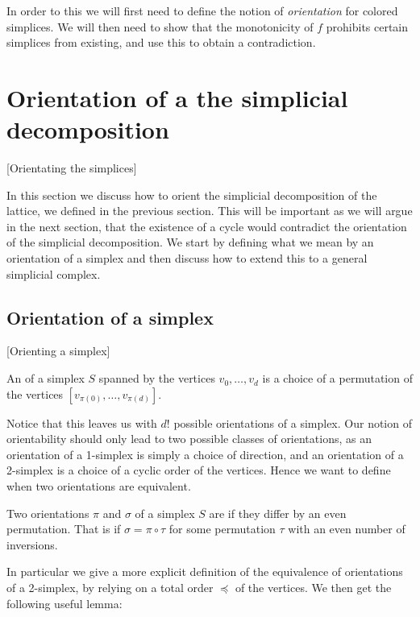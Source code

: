 In order to this we will first need to define the notion of \emph{orientation} for colored simplices. We will then need to show that the monotonicity of $f$ prohibits certain simplices from existing, and use this to obtain a contradiction.

\section{Orientation of a the simplicial decomposition}[Orientating the simplices]

In this section we discuss how to orient the simplicial decomposition of the lattice, we defined in the previous section. This will be important as we will argue in the next section, that the existence of a cycle would contradict the orientation of the simplicial decomposition. We start by defining what we mean by an orientation of a simplex and then discuss how to extend this to a general simplicial complex.

\subsection{Orientation of a simplex}[Orienting a simplex]
\label{sec:orientation_of_simplex}

\begin{definition}
	An  of a simplex $S$ spanned by the vertices $v_0, \dots, v_d$ is a choice of a permutation of the vertices $[v_{\pi(0)}, \dots, v_{\pi(d)}]$.
\end{definition}

Notice that this leaves us with $d!$ possible orientations of a simplex. Our notion of orientability should only lead to two possible classes of orientations, as an orientation of a 1-simplex is simply a choice of direction, and an orientation of a 2-simplex is a choice of a cyclic order of the vertices. Hence we want to define when two orientations are equivalent.

\begin{definition}
	Two orientations $\pi$ and $\sigma$ of a simplex $S$ are  if they differ by an even permutation. That is if $\sigma = \pi \circ \tau$ for some permutation $\tau$ with an even number of inversions.
\end{definition}

In particular we give a more explicit definition of the equivalence of orientations of a 2-simplex, by relying on a total order $\preceq$ of the vertices. We then get the following useful lemma:

